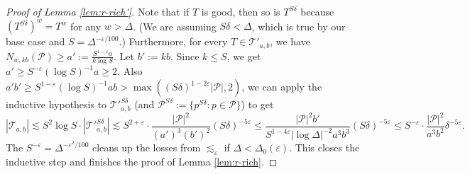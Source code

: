 \documentclass{amsart}
\newcommand{\T}{\mathcal{T}}
\newcommand{\eps}{\varepsilon}
\newcommand{\lesim}{\lesssim}
\newcommand{\cP}{\mathcal{P}}
\begin{document}
\begin{proof}[Proof of Lemma \ref{lem:r-rich'}]
    Note that if $T$ is good, then so is $T^{S\delta}$ because $(T^{S\delta})^w = T^w$ for any $w > \Delta$. (We are assuming $S\delta < \Delta$, which is true by our base case and $S = \Delta^{-\eps/100}$.) Furthermore, for every $T \in \T'_{a,b}$, we have $N_{w,kb} (\cP) \ge a' := \frac{S^{1-\eps} a}{k \log S}$. Let $b' := kb$. Since $k \le S$, we get $a' \ge S^{-\eps} (\log S)^{-1} a \ge 2$. Also $a'b' \ge S^{1-\eps} (\log S)^{-1} ab > \max((S\delta)^{1-2\eps} |\cP|, 2)$, we can apply the inductive hypothesis to $\T'^{S\delta}_{a,b}$ (and $\cP^{S\delta} := \{ p^{S\delta} : p \in \cP \}$) to get
    \begin{equation*}
        |\T_{a,b}| \lesim S^2 \log S \cdot |\T'^{S\delta}_{a,b}| \lesim S^{2+\eps} \cdot \frac{|\cP|^2}{(a')^3 (b')^2} (S\delta)^{-5\eps} \le  \frac{|\cP|^2 b'}{S^{1-4\eps} |\log \Delta|^{-2} a^3 b^3} (S\delta)^{-5\eps} \le S^{-\eps} \cdot \frac{|\cP|^2}{a^3 b^2} \delta^{-5\eps}.
    \end{equation*}
    The $S^{-\eps} = \Delta^{-\eps^2/100}$ cleans up the losses from $\lesim_\eps$ if $\Delta < \Delta_0 (\eps)$. This closes the inductive step and finishes the proof of Lemma \ref{lem:r-rich}.
    

\end{proof}
\end{document}
